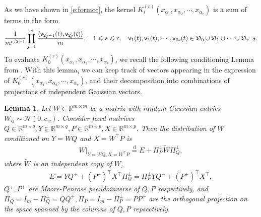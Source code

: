 \documentclass{article}
\numberwithin{equation}{section}
\renewcommand{\cal}{\mathcal}
\newcommand{\cN}{{\cal N}}
\newcommand{\fD}{{\frak D}}
\newcommand{\sfv}{{\mathsf v}}
\newcommand{\bR}{{\mathbb R}}
\newcommand{\al}{\alpha}
\renewcommand{\leq}{\leqslant}
\newcommand{\1}{\mathds{1}}
\theoremstyle{plain} %
\newtheorem{lemma}[theorem]{Lemma}
\begin{document}
As we have shown in \eqref{e:formcc}, the kernel $K^{(r)}_t(x_{\al_1}, x_{\al_2}, \cdots, x_{\al_r})$ is a sum of terms in the form
\begin{align}\label{e:formcopy}
\frac{1}{m^{r/2-1}}\prod_{j=1}^s \frac{\langle \sfv_{2j-1}(t),\sfv_{2j}(t)\rangle}{m}, \quad 1\leq s\leq r,\quad \sfv_1(t), \sfv_2(t),\cdots, \sfv_{2s}(t)\in \fD_0\cup \fD_1\cup \cdots \cup \fD_{r-2}.
\end{align}
To evaluate $K_0^{(r)}(x_{\al_1}, x_{\al_2}, \cdots, x_{\al_r})$, 
we  recall the following conditioning Lemma  from \cite{DBLP:journals/corr/abs-1902-04760}.
With this lemma, 
we can keep track of vectors appearing in the expression of $K_0^{(r)}(x_{\al_1}, x_{\al_2}, \cdots, x_{\al_r})$, and their decomposition into combinations of projections of independent Gaussian vectors. 
\begin{lemma}\label{l:decompose}
Let $W\in \bR^{m\times m}$ be a matrix with random Gaussian entries $W_{ij}\sim \cN(0,c_w)$. Consider fixed matrices $Q\in \bR^{m\times q}, Y\in \bR^{m\times q}, P\in \bR^{m\times p},  X\in \bR^{m\times p}$. Then the distribution of $W$ conditioned on $Y=WQ$ and $X=W^\top P$ is 
\begin{align*}
W|_{Y=WQ, X=W^\top P}\stackrel{\text{d}}{=} E+\Pi_P^\perp\tilde W \Pi_Q^\perp,
\end{align*}
where $\tilde W$ is an independent copy of $W$,
\begin{align*}
E=YQ^++(P^+)^\top X^\top\Pi_Q^\perp=\Pi_P^\perp YQ^++(P^+)^\top X^\top,
\end{align*}
$Q^+, P^+$ are Moore-Penrose pseudoinverse of $Q,P$ respectively, and $\Pi_Q=I_m-\Pi_Q^\perp=QQ^+, \Pi_P=I_m-\Pi_P^\perp=PP^+$ are the orthogonal projection on the space spanned by the columns of $Q,P$ repsectively.
\end{lemma}
\end{document}
